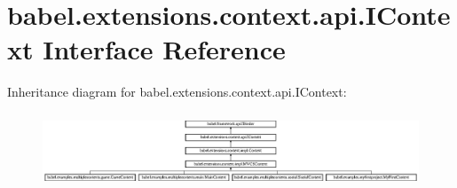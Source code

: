 \hypertarget{interfacebabel_1_1extensions_1_1context_1_1api_1_1_i_context}{\section{babel.\-extensions.\-context.\-api.\-I\-Context Interface Reference}
\label{interfacebabel_1_1extensions_1_1context_1_1api_1_1_i_context}
}
Inheritance diagram for babel.\-extensions.\-context.\-api.\-I\-Context\-:\begin{figure}[H]
\begin{center}
\leavevmode
\includegraphics[height=2.208202cm]{interfacebabel_1_1extensions_1_1context_1_1api_1_1_i_context}
\end{center}
\end{figure}
